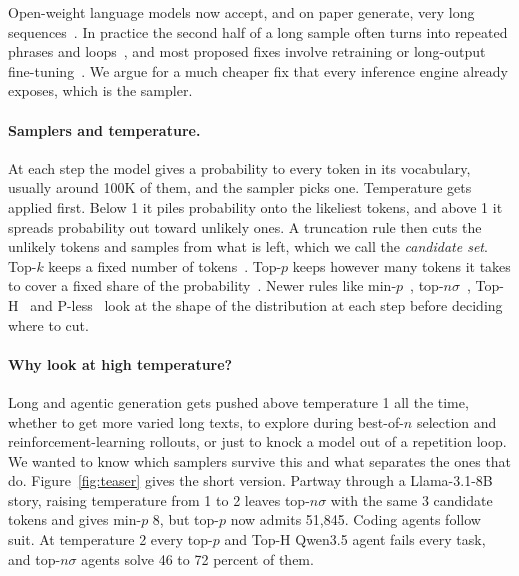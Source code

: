 \documentclass{article}
\begin{document}
Open-weight language models now accept, and on paper generate, very long sequences~\citep{dubey2024llama3,yang2024qwen2}. In practice the second half of a long sample often turns into repeated phrases and loops~\citep{holtzman2020curious,welleck2020neural,fu2021theoretical}, and most proposed fixes involve retraining or long-output fine-tuning~\citep{bai2025longwriter}. We argue for a much cheaper fix that every inference engine already exposes, which is the sampler.

\paragraph{Samplers and temperature.}
At each step the model gives a probability to every token in its vocabulary, usually around 100K of them, and the sampler picks one. Temperature gets applied first. Below 1 it piles probability onto the likeliest tokens, and above 1 it spreads probability out toward unlikely ones. A truncation rule then cuts the unlikely tokens and samples from what is left, which we call the \emph{candidate set}. Top-$k$ keeps a fixed number of tokens~\citep{fan2018hierarchical}. Top-$p$ keeps however many tokens it takes to cover a fixed share of the probability~\citep{holtzman2020curious}. Newer rules like min-$p$~\citep{nguyen2024minp}, top-$n\sigma$~\citep{tang2024topnsigma}, Top-H~\citep{baghaei2025toph} and P-less~\citep{tan2025pless} look at the shape of the distribution at each step before deciding where to cut.

\paragraph{Why look at high temperature?}
Long and agentic generation gets pushed above temperature 1 all the time, whether to get more varied long texts, to explore during best-of-$n$ selection and reinforcement-learning rollouts, or just to knock a model out of a repetition loop. We wanted to know which samplers survive this and what separates the ones that do. Figure~\ref{fig:teaser} gives the short version. Partway through a Llama-3.1-8B story, raising temperature from 1 to 2 leaves top-$n\sigma$ with the same 3 candidate tokens and gives min-$p$ 8, but top-$p$ now admits 51,845. Coding agents follow suit. At temperature 2 every top-$p$ and Top-H Qwen3.5 agent fails every task, and top-$n\sigma$ agents solve 46 to 72 percent of them.
\end{document}
